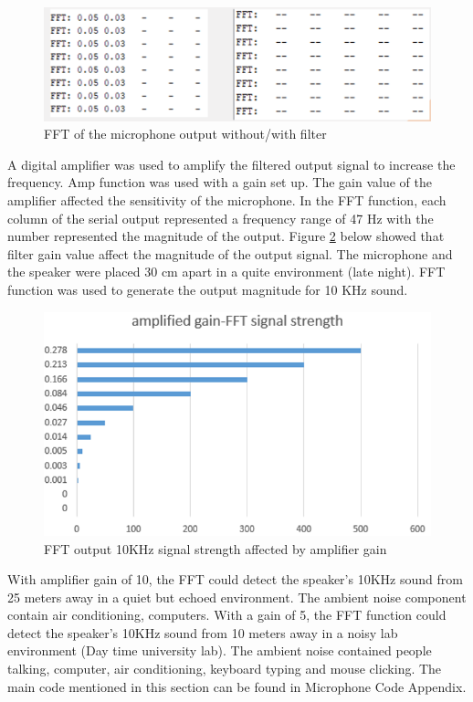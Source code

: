 \begin{figure}[H]
	\centering
	\noindent\includegraphics[width=1\textwidth]{images/FFT.png}
	\caption{FFT of the microphone output without/with filter}
	\label{fig:FFT}
\end{figure}
A digital amplifier was used to amplify the filtered output signal to increase the frequency. Amp function was used with a gain set up. The gain value of the amplifier affected the sensitivity of the microphone. In the FFT function, each column of the serial output represented a frequency range of 47 Hz with the number represented the magnitude of the output. Figure \ref{fig:gain} below showed that filter gain value affect the magnitude of the output signal. The microphone and the speaker were placed 30 cm apart in a quite environment (late night). FFT function was used to generate the output magnitude for 10 KHz sound. 
\begin{figure}[H]
	\centering
	\noindent\includegraphics[width=1\textwidth]{images/Gain.png}
	\caption{FFT output 10KHz signal strength affected by amplifier gain }
	\label{fig:gain}
\end{figure}
With amplifier gain of 10, the FFT could detect the speaker's 10KHz sound from 25 meters away in a quiet but echoed environment. The ambient noise component contain air conditioning, computers. With a gain of 5, the FFT function could detect the speaker's 10KHz sound from 10 meters away in a noisy lab environment (Day time university lab). The ambient noise contained people talking, computer, air conditioning, keyboard typing and mouse clicking. The main code mentioned in this section can be found in Microphone Code Appendix.  




